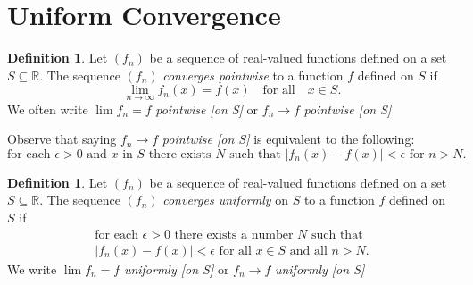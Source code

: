 \documentclass[12pt, lettersize]{book}
\theoremstyle{plain}
\theoremstyle{definition}
\newtheorem{dfn}[thm]{Definition}
\theoremstyle{remark}
\newcommand{\R}{\mathbb{R}}
\begin{document}
		\section{Uniform Convergence}
			\begin{dfn}
			Let $(f_n)$ be a sequence of real-valued functions defined on a set $S\subseteq\R$. The sequence $(f_n)$ \emph{converges pointwise} to a function $f$ defined on $S$ if
			\begin{displaymath}
				\lim\limits_{n\rightarrow\infty}f_n(x)=f(x)\quad\text{for all}\quad x\in S.
			\end{displaymath}
			We often write $\lim f_n=f$ \emph{pointwise [on S]} or $f_n\rightarrow f$ \emph{pointwise [on S]}
			\end{dfn}
			Observe that saying $f_n\rightarrow f$ \emph{pointwise [on S]} is equivalent to the following:
			\begin{displaymath}
				\text{for each $\epsilon>0$ and $x$ in $S$ there exists $N$ such that $|f_n(x)-f(x)|<\epsilon$ for $n>N$.}
			\end{displaymath}
			
			\begin{dfn}
			Let $(f_n)$ be a sequence of real-valued functions defined on a set $S\subseteq\R$. The sequence $(f_n)$ \emph{converges uniformly} on $S$ to a function $f$ defined on $S$ if
			\begin{align*}
				\text{for each $\epsilon>0$ there exists a number $N$ such that}\\
				\text{$|f_n(x)-f(x)|<\epsilon$ for all $x\in S$ and all $n>N$.}
			\end{align*}
			We write $\lim f_n=f$ \emph{uniformly [on S]} or $f_n\rightarrow f$ \emph{uniformly [on S]}
			\end{dfn}
			
\end{document}
